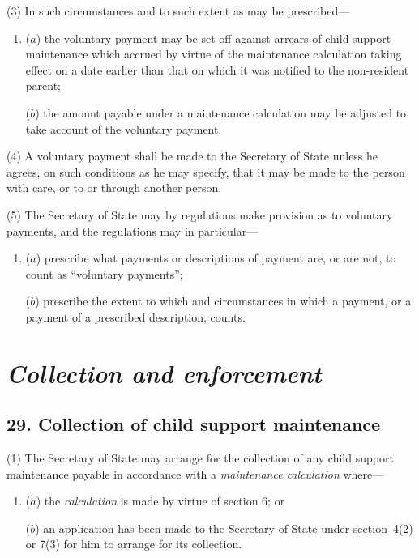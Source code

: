 \documentclass[12pt,a4paper]{article}
\begin{document}
(3) In such circumstances and to such extent as may be prescribed—
\begin{enumerate}\item[]
($a$) the voluntary payment may be set off against arrears of child support maintenance which accrued by virtue of the maintenance calculation taking effect on a date earlier than that on which it was notified to the non-resident parent;

($b$) the amount payable under a maintenance calculation may be adjusted to take account of the voluntary payment.
\end{enumerate}

(4) A voluntary payment shall be made to the Secretary of State unless he agrees, on such conditions as he may specify, that it may be made to the person with care, or to or through another person.

(5) The Secretary of State may by regulations make provision as to voluntary payments, and the regulations may in particular—
\begin{enumerate}\item[]
($a$) prescribe what payments or descriptions of payment are, or are not, to count as “voluntary payments”;

($b$) prescribe the extent to which and circumstances in which a payment, or a payment of a prescribed description, counts.
\end{enumerate}


\section{\itshape Collection and enforcement}

\subsection{29. Collection of child support maintenance}

(1) The Secretary of State may arrange for the collection of any child support maintenance payable in accordance with a 
\emph{maintenance calculation}  %
where—
\begin{enumerate}\item[]
($a$) the 
\emph{calculation}  %
is made by virtue of section 6; or

($b$) an application has been made to the Secretary of State under section~4(2)  or 7(3)  for him to arrange for its collection.
\end{enumerate}
\end{document}
